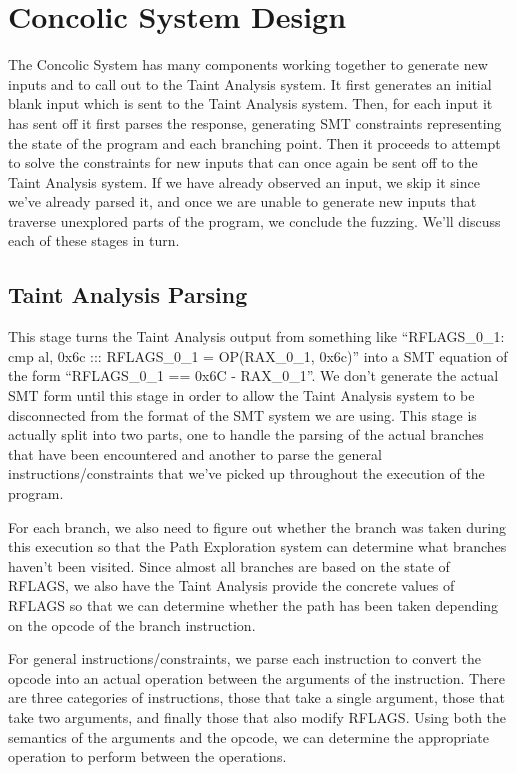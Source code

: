 \section{Concolic System Design}
The Concolic System has many components working together to generate new inputs
and to call out to the Taint Analysis system. It first generates an initial
blank input which is sent to the Taint Analysis system. Then, for each input it
has sent off it first parses the response, generating SMT constraints
representing the state of the program and each branching point. Then it proceeds
to attempt to solve the constraints for new inputs that can once again be sent
off to the Taint Analysis system. If we have already observed an input, we skip
it since we've already parsed it, and once we are unable to generate new inputs
that traverse unexplored parts of the program, we conclude the fuzzing. We'll
discuss each of these stages in turn.

\subsection{Taint Analysis Parsing}
This stage turns the Taint Analysis output from something like 
``RFLAGS\_0\_1: cmp al, 0x6c ::: RFLAGS\_0\_1 = OP(RAX\_0\_1, 0x6c)'' into a SMT
equation of the form ``RFLAGS\_0\_1 == 0x6C - RAX\_0\_1''. We don't generate the
actual SMT form until this stage in order to allow the Taint Analysis system to
be disconnected from the format of the SMT system we are using. This stage is
actually split into two parts, one to handle the parsing of the actual branches
that have been encountered and another to parse the general
instructions/constraints that we've picked up throughout the execution of the
program.

For each branch, we also need to figure out whether the branch was taken during
this execution so that the Path Exploration system can determine what branches
haven't been visited. Since almost all branches are based on the state of
RFLAGS, we also have the Taint Analysis provide the concrete values of RFLAGS so
that we can determine whether the path has been taken depending on the opcode of
the branch instruction.

For general instructions/constraints, we parse each instruction to convert the
opcode into an actual operation between the arguments of the instruction. There
are three categories of instructions, those that take a single argument, those
that take two arguments, and finally those that also modify RFLAGS. Using both
the semantics of the arguments and the opcode, we can determine the appropriate
operation to perform between the operations.

